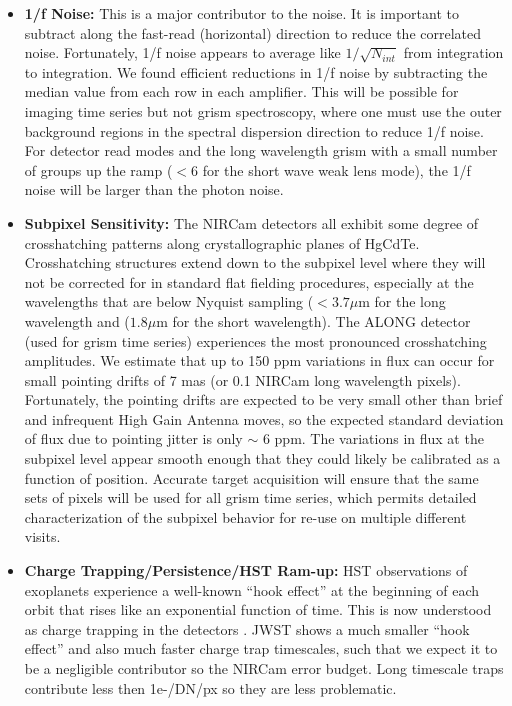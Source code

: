 \documentclass{aastex62}
\begin{document}
\begin{itemize}
	\item \textbf{1/f Noise:} This is a major contributor to the noise.
	It is important to subtract along the fast-read (horizontal) direction to reduce the correlated noise.
	Fortunately, 1/f noise appears to average like $1/\sqrt{N_{int}} $ from integration to integration.
	We found efficient reductions in 1/f noise by subtracting the median value from each row in each amplifier.
	This will be possible for imaging time series but not grism spectroscopy, where one must use the outer background regions in the spectral dispersion direction to reduce 1/f noise.
	For detector read modes and the long wavelength grism with a small number of groups up the ramp ($<6$ for the short wave weak lens mode), the 1/f noise will be larger than the photon noise.
	\item \textbf{Subpixel Sensitivity:} The NIRCam detectors all exhibit some degree of crosshatching patterns along crystallographic planes of HgCdTe.
	Crosshatching structures extend down to the subpixel level where they will not be corrected for in standard flat fielding procedures, especially at the wavelengths that are below Nyquist sampling ($< 3.7\mu$m for the long wavelength and ($1.8\mu$m for the short wavelength).
	The ALONG detector (used for grism time series) experiences the most pronounced crosshatching amplitudes.
	We estimate that up to 150 ppm variations in flux can occur for small pointing drifts of 7 mas (or 0.1 NIRCam long wavelength pixels).
	Fortunately, the pointing drifts are expected to be very small other than brief and infrequent High Gain Antenna moves, so the expected standard deviation of flux due to pointing jitter is only $\sim$ 6 ppm.
	The variations in flux at the subpixel level appear smooth enough that they could likely be calibrated as a function of position.
	Accurate target acquisition will ensure that the same sets of pixels will be used for all grism time series, which permits detailed characterization of the subpixel behavior for re-use on multiple different visits.
	\item \textbf{Charge Trapping/Persistence/HST Ram-up:} HST observations of exoplanets experience a well-known ``hook effect'' at the beginning of each orbit that rises like an exponential function of time.
	This is now understood as charge trapping in the detectors \citep{zhou2017chargeTrap}.
	JWST shows a much smaller ``hook effect'' and also much faster charge trap timescales, such that we expect it to be a negligible contributor so the NIRCam error budget.
	Long timescale traps contribute less then 1e-/DN/px so they are less problematic.
\end{itemize}
\end{document}
